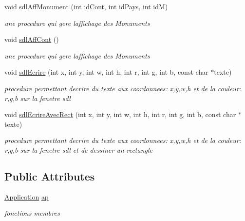 \begin{DoxyCompactItemize}
void \mbox{\hyperlink{classsdlApp_a6fadeb27ecf0fee2504d3130e911abf8}{sdl\+Aff\+Monument}} (int id\+Cont, int id\+Pays, int idM)
\begin{DoxyCompactList}\small\item\em une procedure qui gere l\textquotesingle{}affichage des Monuments \end{DoxyCompactList}\item 
void \mbox{\hyperlink{classsdlApp_a54d9cd6155163835380a535ca257e5b4}{sdl\+Aff\+Cont}} ()
\begin{DoxyCompactList}\small\item\em une procedure qui gere l\textquotesingle{}affichage des Monuments \end{DoxyCompactList}\item 
void \mbox{\hyperlink{classsdlApp_ae4db12d802dc7b8dd0a6b284897917bf}{sdl\+Ecrire}} (int x, int y, int w, int h, int r, int g, int b, const char $\ast$texte)
\begin{DoxyCompactList}\small\item\em procedure permettant d\textquotesingle{}ecrire du texte aux coordonnees\+: x,y,w,h et de la couleur\+: r,g,b sur la fenetre sdl \end{DoxyCompactList}\item 
void \mbox{\hyperlink{classsdlApp_a8ccb9775a7ef085eec26a60f4564d3bd}{sdl\+Ecrire\+Avec\+Rect}} (int x, int y, int w, int h, int r, int g, int b, const char $\ast$texte)
\begin{DoxyCompactList}\small\item\em procedure permettant d\textquotesingle{}ecrire du texte aux coordonnees\+: x,y,w,h et de la couleur\+: r,g,b sur la fenetre sdl et de dessiner un rectangle \end{DoxyCompactList}\end{DoxyCompactItemize}
\subsection*{Public Attributes}
\begin{DoxyCompactItemize}
\item 
\mbox{\hyperlink{classApplication}{Application}} \mbox{\hyperlink{classsdlApp_a721d26218fa45ca53705f1dbbee8dfba}{ap}}
\begin{DoxyCompactList}\small\item\em fonctions membres \end{DoxyCompactList}\end{DoxyCompactItemize}


